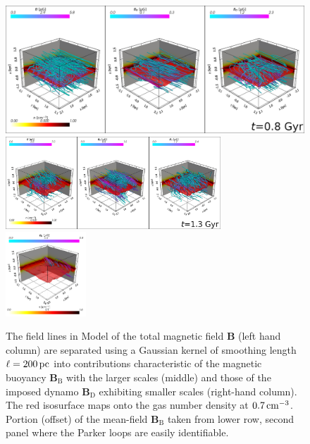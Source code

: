 \documentclass[fleqn,usenatbib]{mnras}
\newcommand{\RSOBSD}{{\sf{O60q0.3}}}
\renewcommand\vec[1]{\bm{#1}}%
\newcommand{\BB}{\vec{B}} %
\newcommand{\cm}{\,{\rm cm}}    %
\newcommand{\p}{\,{\rm pc}}     %
\begin{document}
\begin{figure}%
    \centering
    \includegraphics[trim=0.0cm 0.0cm -23.9cm 0.0cm,clip=true,width=1\textwidth]{3d_streamlines_t08.png}\\
    \includegraphics[width=0.72\textwidth]{3d_streamlines_t13.png}
    \includegraphics[trim=0.0cm -2.0cm 0.0cm 0.0cm,clip=true,width=0.27\textwidth]{parker_loops.png}
    \caption{The field lines in Model {\RSOBSD} of the total magnetic field
$\BB$ (left hand column) are separated using a Gaussian kernel of smoothing
length $\ell=200\p$ into contributions characteristic of the magnetic buoyancy
$\BB_\text{B}$ with the larger scales (middle) and those of the imposed dynamo
$\BB_\text{D}$ exhibiting smaller scales (right-hand column). The red
isosurface maps onto the gas number density at $0.7\cm^{-3}$.
\label{fig:streamlines} \label{fig:loops} Portion {(offset)} of the
mean-field $\BB_\text{B}$ taken from {lower row, second panel} where the
Parker loops are easily identifiable.}
\end{figure}%
\end{document}
